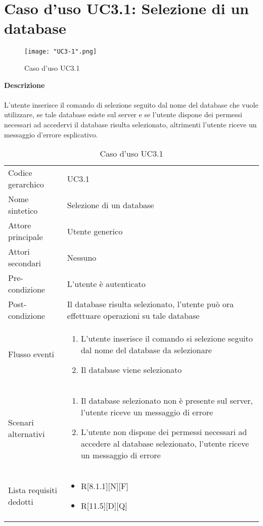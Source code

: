 \documentclass[a4paper]{report}
\begin{document}
	 \section{Caso d'uso UC3.1: Selezione di un database}
	 	\begin{figure}[H]
			\centering
			\texttt{[image: "UC3-1".png]}
			\caption{Caso d'uso UC3.1}
		\end{figure}
	 \textbf{Descrizione} \\ \\
	 L'utente inserisce il comando di selezione seguito dal nome del database che vuole utilizzare, se tale
	  database esiste sul server e se l'utente dispone dei permessi necessari ad accedervi il database risulta
	   selezionato, altrimenti l'utente riceve un messaggio d'errore esplicativo.
		\begin{table}[H]
		\begin{tabularx}{\textwidth}{X | X}\toprule
			\rowcolor{orange!65}Codice gerarchico & UC3.1 \\
			Nome sintetico & Selezione di un database \\
			\rowcolor{orange!65}Attore principale & Utente generico\\
			Attori secondari & Nessuno \\
			\rowcolor{orange!65}Pre-condizione & L'utente è autenticato\\
			Post-condizione & Il database risulta selezionato, l'utente può ora effettuare operazioni su tale
			database \\
			\rowcolor{orange!65}Flusso eventi & \begin{enumerate}
			\item L'utente inserisce il comando si selezione seguito dal nome del database da selezionare
			\item Il database viene selezionato
			\end{enumerate} \\
			Scenari alternativi &  \begin{enumerate}
			\item Il database selezionato non è presente sul server, l'utente riceve un messaggio di errore
			\item L'utente non dispone dei permessi necessari ad accedere al database selezionato, l'utente
			riceve un messaggio di errore
			\end{enumerate}			 \\
			\rowcolor{orange!65}Lista requisiti dedotti & \begin{itemize}
				\item R[8.1.1][N][F]
				\item R[11.5][D][Q]
				\end{itemize} \\
			\bottomrule
		\end{tabularx}
		\caption{Caso d'uso UC3.1}
	 \end{table}
\end{document}
